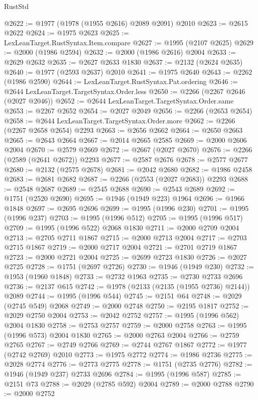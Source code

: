 \begin{lexlean}{RustStd}
\begin{coremodule}
@2622 := @1977 (@1978 (@1955 @2616) @2089 @2091) @2010
@2623 := @2615 @2622
@2624 := @1975 @2623
@2625 := LexLeanTarget.RustSyntax.Item.compare
@2627 := @1995 (@2107 @2625)
@2629 := @2000 (@1986 @2594)
@2632 := @2000 (@1986 @2616) @2004
@2633 := @2629 @2632
@2635 := @2627 @2633 @1830
@2637 := @2132 (@2624 @2635)
@2640 := @1977 (@2593 @2637) @2010
@2641 := @1975 @2640
@2643 := @2262 (@1986 @2590)
@2644 := LexLeanTarget.RustSyntax.Pat.ordering
@2646 := @2644 LexLeanTarget.TargetSyntax.Order.less
@2650 := @2266 (@2267 @2646 (@2027 @2046))
@2652 := @2644 LexLeanTarget.TargetSyntax.Order.same
@2653 := @2267 @2652
@2654 := @2027 @2049
@2656 := @2266 (@2653 @2654)
@2658 := @2644 LexLeanTarget.TargetSyntax.Order.more
@2662 := @2266 (@2267 @2658 @2654) @2293
@2663 := @2656 @2662
@2664 := @2650 @2663
@2665 := @2643 @2664
@2667 := @2014 @2665 @2585
@2669 := @2000 @2606 @2004
@2670 := @2579 @2669
@2672 := @2667 (@2027 @2670)
@2676 := @2266 (@2589 (@2641 @2672)) @2293
@2677 := @2587 @2676
@2678 := @2577 @2677
@2680 := @2132 (@2575 @2678)
@2681 := @2042 @2680
@2682 := @1986 @2458
@2683 := @2681 @2682
@2687 := @2266 (@2553 (@2027 @2683)) @2293
@2688 := @2548 @2687
@2689 := @2545 @2688
@2690 := @2543 @2689
@2692 := @1751 (@2520 @2690)
@2695 := @1946 (@1949 @223) @1964
@2696 := @1966 @1848
@2697 := @2695 @2696
@2699 := @1995 (@1996 @230)
@2701 := @1995 (@1996 @237)
@2703 := @1995 (@1996 @512)
@2705 := @1995 (@1996 @517)
@2709 := @1995 (@1996 @522) @2068 @1830
@2711 := @2000 @2709 @2004
@2713 := @2705 @2711 @1867
@2715 := @2000 @2713 @2004
@2717 := @2703 @2715 @1867
@2719 := @2000 @2717 @2004
@2721 := @2701 @2719 @1867
@2723 := @2000 @2721 @2004
@2725 := @2699 @2723 @1830
@2726 := @2027 @2725
@2728 := @1751 (@2697 @2726)
@2730 := @1946 (@1949 @230)
@2732 := @1953 (@1960 @1848)
@2733 := @2732 @1963
@2735 := @2730 @2733 @2696
@2736 := @2137 @615
@2742 := @1978 (@2133 (@2135 (@1955 @2736) @2144)) @2089
@2744 := @1995 (@1996 @544)
@2745 := @2151 @64
@2748 := @2029 (@2745 @549) @2068
@2749 := @2000 @2748
@2750 := @2195 @1817
@2752 := @2029 @2750 @2004
@2753 := @2042 @2752
@2757 := @1995 (@1996 @562) @2004 @1830
@2758 := @2753 @2757
@2759 := @2000 @2758
@2763 := @1995 (@1996 @573) @2004 @1830
@2765 := @2000 @2763 @2004
@2766 := @2759 @2765
@2767 := @2749 @2766
@2769 := @2744 @2767 @1867
@2772 := @1977 (@2742 @2769) @2010
@2773 := @1975 @2772
@2774 := @1986 @2736
@2775 := @2028 @2774
@2776 := @2773 @2775
@2778 := @1751 (@2735 @2776)
@2782 := @1946 (@1949 @237) @2733 @2696
@2784 := @1995 (@1996 @587)
@2785 := @2151 @73
@2788 := @2029 (@2785 @592) @2004
@2789 := @2000 @2788
@2790 := @2000 @2752

\end{coremodule}
\end{lexlean}
